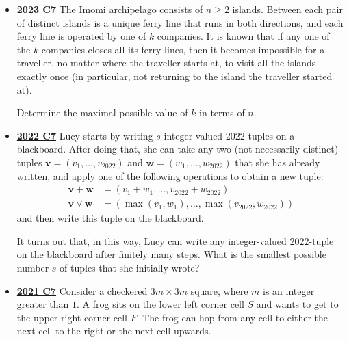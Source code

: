 \documentclass[11pt]{scrartcl}
\begin{document}
\begin{itemize}[leftmargin=*]
(An infinite sequence $b_1, b_2, b_3, \dots$ is eventually periodic if there exist positive integers $p$ and $M$ such that $b_{m+p} = b_m$ for all $m \geqslant M$.)
\item \href{https://artofproblemsolving.com/community/c6h3359751p31218524}{\textbf{2023 C7}} The Imomi archipelago consists of $n\geqslant  2$ islands. Between each pair of distinct islands is a unique ferry line that runs in both directions, and each ferry line is operated by one of $k$ companies. It is known that if any one of the $k$ companies closes all its ferry lines, then it becomes impossible for a traveller, no matter where the traveller starts at, to visit all the islands exactly once (in particular, not returning to the island the traveller started at).

Determine the maximal possible value of $k$ in terms of $n$.
    \item \href{https://artofproblemsolving.com/community/c6h3107374p28104616}{\textbf{2022 C7}} Lucy starts by writing $s$ integer-valued $2022$-tuples on a blackboard. After doing that, she can take any two (not necessarily distinct) tuples $\mathbf{v}=(v_1,\dots,v_{2022})$ and $\mathbf{w}=(w_1,\dots,w_{2022})$ that she has already written, and apply one of the following operations to obtain a new tuple:
\begin{align*}
\mathbf{v}+\mathbf{w}&=(v_1+w_1,\dots,v_{2022}+w_{2022}) \\
\mathbf{v} \lor \mathbf{w}&=(\max(v_1,w_1),\dots,\max(v_{2022},w_{2022}))
\end{align*}and then write this tuple on the blackboard.

It turns out that, in this way, Lucy can write any integer-valued $2022$-tuple on the blackboard after finitely many steps. What is the smallest possible number $s$ of tuples that she initially wrote?
    \item \href{https://artofproblemsolving.com/community/c6h2882582p25627814}{\textbf{2021 C7}} Consider a checkered $3m\times 3m$ square, where $m$ is an integer greater than $1.$ A frog sits on the lower left corner cell $S$ and wants to get to the upper right corner cell $F.$ The frog can hop from any cell to either the next cell to the right or the next cell upwards.


\end{itemize}
\end{document}

